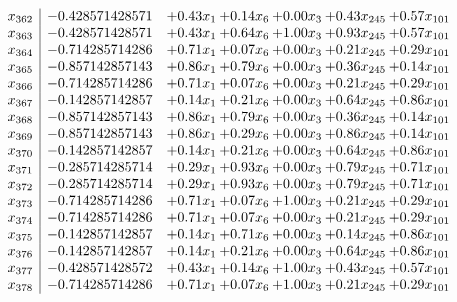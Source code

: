 \documentclass[8pt]{article}
\begin{document}
\[\begin{array}{c| c c@{\hskip 2pt} c@{\hskip 2pt} c@{\hskip 2pt} c@{\hskip 2pt} c@{\hskip 2pt} }
 x_{362}   &  -0.428571428571 & +  0.43 x_{1} & +  0.14 x_{6} & +  0.00 x_{3} & +  0.43 x_{245} & +  0.57 x_{101}\\
 x_{363}   &  -0.428571428571 & +  0.43 x_{1} & +  0.64 x_{6} & +  1.00 x_{3} & +  0.93 x_{245} & +  0.57 x_{101}\\
 x_{364}   &  -0.714285714286 & +  0.71 x_{1} & +  0.07 x_{6} & +  0.00 x_{3} & +  0.21 x_{245} & +  0.29 x_{101}\\
 x_{365}   &  -0.857142857143 & +  0.86 x_{1} & +  0.79 x_{6} & +  0.00 x_{3} & +  0.36 x_{245} & +  0.14 x_{101}\\
 x_{366}   &  -0.714285714286 & +  0.71 x_{1} & +  0.07 x_{6} & +  0.00 x_{3} & +  0.21 x_{245} & +  0.29 x_{101}\\
 x_{367}   &  -0.142857142857 & +  0.14 x_{1} & +  0.21 x_{6} & +  0.00 x_{3} & +  0.64 x_{245} & +  0.86 x_{101}\\
 x_{368}   &  -0.857142857143 & +  0.86 x_{1} & +  0.79 x_{6} & +  0.00 x_{3} & +  0.36 x_{245} & +  0.14 x_{101}\\
 x_{369}   &  -0.857142857143 & +  0.86 x_{1} & +  0.29 x_{6} & +  0.00 x_{3} & +  0.86 x_{245} & +  0.14 x_{101}\\
 x_{370}   &  -0.142857142857 & +  0.14 x_{1} & +  0.21 x_{6} & +  0.00 x_{3} & +  0.64 x_{245} & +  0.86 x_{101}\\
 x_{371}   &  -0.285714285714 & +  0.29 x_{1} & +  0.93 x_{6} & +  0.00 x_{3} & +  0.79 x_{245} & +  0.71 x_{101}\\
 x_{372}   &  -0.285714285714 & +  0.29 x_{1} & +  0.93 x_{6} & +  0.00 x_{3} & +  0.79 x_{245} & +  0.71 x_{101}\\
 x_{373}   &  -0.714285714286 & +  0.71 x_{1} & +  0.07 x_{6} & +  1.00 x_{3} & +  0.21 x_{245} & +  0.29 x_{101}\\
 x_{374}   &  -0.714285714286 & +  0.71 x_{1} & +  0.07 x_{6} & +  0.00 x_{3} & +  0.21 x_{245} & +  0.29 x_{101}\\
 x_{375}   &  -0.142857142857 & +  0.14 x_{1} & +  0.71 x_{6} & +  0.00 x_{3} & +  0.14 x_{245} & +  0.86 x_{101}\\
 x_{376}   &  -0.142857142857 & +  0.14 x_{1} & +  0.21 x_{6} & +  0.00 x_{3} & +  0.64 x_{245} & +  0.86 x_{101}\\
 x_{377}   &  -0.428571428572 & +  0.43 x_{1} & +  0.14 x_{6} & +  1.00 x_{3} & +  0.43 x_{245} & +  0.57 x_{101}\\
 x_{378}   &  -0.714285714286 & +  0.71 x_{1} & +  0.07 x_{6} & +  1.00 x_{3} & +  0.21 x_{245} & +  0.29 x_{101}\\

\end{array}\]
\end{document}
